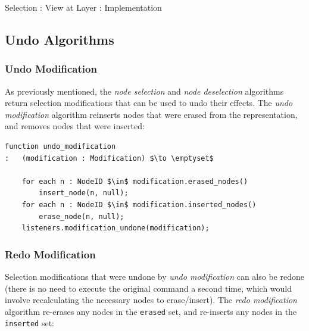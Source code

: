 \begin{stulisting}[p]
\caption{Selection : View at Layer : Implementation}
\label{code:ipfs-selection-viewatlayer}

\end{stulisting}


\afterpage{\clearpage}
\newpage

\subsection{Undo Algorithms}

\subsubsection{Undo Modification}


As previously mentioned, the \emph{node selection} and \emph{node deselection} algorithms return selection modifications that can be used to undo their effects. The \emph{undo modification} algorithm reinserts nodes that were erased from the representation, and removes nodes that were inserted:

\begin{lstlisting}[style=Default,backgroundcolor={\color[gray]{0.8}}]
function undo_modification
:	(modification : Modification) $\to \emptyset$

	for each n : NodeID $\in$ modification.erased_nodes()
		insert_node(n, null);
	for each n : NodeID $\in$ modification.inserted_nodes()
		erase_node(n, null);
	listeners.modification_undone(modification);
\end{lstlisting}

\subsubsection{Redo Modification}


Selection modifications that were undone by \emph{undo modification} can also be redone (there is no need to execute the original command a second time, which would involve recalculating the necessary nodes to erase/insert). The \emph{redo modification} algorithm re-erases any nodes in the \texttt{erased} set, and re-inserts any nodes in the \texttt{inserted} set:

